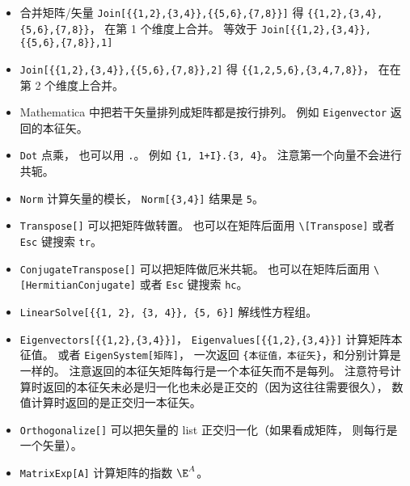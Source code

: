 \begin{itemize}
\item 合并矩阵/矢量 \verb|Join[{{1,2},{3,4}},{{5,6},{7,8}}]| 得 \verb|{{1,2},{3,4},{5,6},{7,8}}|， 在第 1 个维度上合并。 等效于 \verb|Join[{{1,2},{3,4}},{{5,6},{7,8}},1]|
\item \verb|Join[{{1,2},{3,4}},{{5,6},{7,8}},2]| 得 \verb|{{1,2,5,6},{3,4,7,8}}|， 在在第 2 个维度上合并。
\item Mathematica 中把若干矢量排列成矩阵都是按行排列。 例如 \verb|Eigenvector| 返回的本征矢。
\item \verb|Dot| 点乘， 也可以用 \verb|.|。 例如 \verb|{1, 1+I}.{3, 4}|。 注意第一个向量不会进行共轭。
\item \verb|Norm| 计算矢量的模长， \verb|Norm[{3,4}]| 结果是 \verb|5|。
\item \verb|Transpose[]| 可以把矩阵做转置。 也可以在矩阵后面用 \verb|\[Transpose]| 或者 \verb|Esc| 键搜索 \verb|tr|。
\item \verb|ConjugateTranspose[]| 可以把矩阵做厄米共轭。 也可以在矩阵后面用 \verb|\[HermitianConjugate]| 或者 \verb|Esc| 键搜索 \verb|hc|。
\item \verb|LinearSolve[{{1, 2}, {3, 4}}, {5, 6}]| 解线性方程组。
\item \verb|Eigenvectors[{{1,2},{3,4}}]|， \verb|Eigenvalues[{{1,2},{3,4}}]| 计算矩阵本征值。 或者 \verb|EigenSystem[矩阵]|， 一次返回 \verb|{本征值，本征矢}|，和分别计算是一样的。 注意返回的本征矢矩阵每行是一个本征矢而不是每列。 注意符号计算时返回的本征矢未必是归一化也未必是正交的（因为这往往需要很久）， 数值计算时返回的是正交归一本征矢。
\item \verb|Orthogonalize[]| 可以把矢量的 list 正交归一化（如果看成矩阵， 则每行是一个矢量）。
\item \verb|MatrixExp[A]| 计算矩阵的指数 $\E^{A}$。
\end{itemize}


